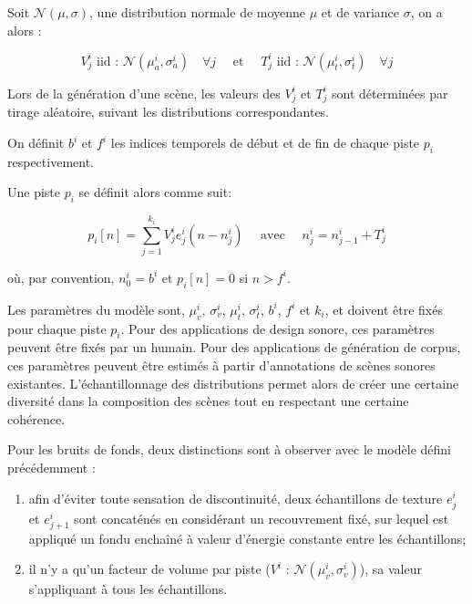 Soit $\mathcal{N}(\mu,\sigma)$, une distribution normale de moyenne $\mu$ et de variance $\sigma$, on a alors :

\begin{equation}
  \label{eq:ch4_eq1}
  V_j^i \textrm{ iid : } \mathcal{N}(\mu_a^{i},\sigma_a^{i}) \quad \forall j \quad \textrm{ et } \quad T_j^i \textrm{ iid : } \mathcal{N}({\mu_t^{i},\sigma_t^{i}}) \quad \forall j
\end{equation}

Lors de la génération d'une scène, les valeurs des $V^i_j$ et $T_j^i$ sont déterminées par tirage aléatoire, suivant les distributions correspondantes.

On définit $b^i$ et $f^i$ les indices temporels de début et de fin de chaque piste $p_i$ respectivement.

Une piste $p_i$ se définit alors comme suit:

\begin{equation}
  \label{eq:ch4_eq2}
  p_{i}[n]= \sum_{j=1}^{k_i} V_j^i e_j^i(n-n_j^i) \quad \textrm{ avec } \quad n_j^i=n_{j-1}^i + T_j^i
\end{equation}

où, par convention, $n^i_0=b^i$ et $p_i[n]=0$ si $n>f^i$.

Les paramètres du modèle sont, $\mu_v^i$, $\sigma_v^i$, $\mu_t^i$, $\sigma_t^i$, $b^i$, $f^i$ et $k_i$, et doivent être fixés pour chaque piste $p_i$. Pour des applications de design sonore, ces paramètres peuvent être fixés par un humain. Pour des applications de génération de corpus, ces paramètres peuvent être estimés à partir d'annotations de scènes sonores existantes. L'échantillonnage des distributions permet alors de créer une certaine diversité dans la composition des scènes tout en respectant une certaine cohérence.


Pour les bruits de fonds, deux distinctions sont à observer avec le modèle défini précédemment :

\begin{enumerate}
  \item afin d'éviter toute sensation de discontinuité, deux échantillons de texture $e_j^i$ et $e_{j+1}^i$ sont concaténés en considérant un recouvrement fixé, sur lequel est appliqué un fondu enchaîné à valeur d'énergie constante entre les échantillons;
  \item il n'y a qu'un facteur de volume par piste ($V^i \textrm{ : } \mathcal{N}(\mu_v^{i},\sigma_v^{i})$), sa valeur s'appliquant à tous les échantillons.
\end{enumerate}

